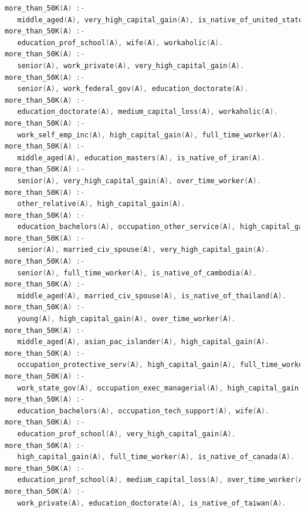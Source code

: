 \documentclass[a4paper]{llncs}
\begin{document}
\begin{lstlisting}[language=c,frame=single,breaklines=true,basicstyle=\footnotesize\ttfamily,caption={Subset of the prolog clauses produced by Aleph},label=ilp_clauses]
more_than_50K(A) :-
   middle_aged(A), very_high_capital_gain(A), is_native_of_united_states(A).
more_than_50K(A) :-
   education_prof_school(A), wife(A), workaholic(A).
more_than_50K(A) :-
   senior(A), work_private(A), very_high_capital_gain(A).
more_than_50K(A) :-
   senior(A), work_federal_gov(A), education_doctorate(A).
more_than_50K(A) :-
   education_doctorate(A), medium_capital_loss(A), workaholic(A).
more_than_50K(A) :-
   work_self_emp_inc(A), high_capital_gain(A), full_time_worker(A).
more_than_50K(A) :-
   middle_aged(A), education_masters(A), is_native_of_iran(A).
more_than_50K(A) :-
   senior(A), very_high_capital_gain(A), over_time_worker(A).
more_than_50K(A) :-
   other_relative(A), high_capital_gain(A).
more_than_50K(A) :-
   education_bachelors(A), occupation_other_service(A), high_capital_gain(A).
more_than_50K(A) :-
   senior(A), married_civ_spouse(A), very_high_capital_gain(A).
more_than_50K(A) :-
   senior(A), full_time_worker(A), is_native_of_cambodia(A).
more_than_50K(A) :-
   middle_aged(A), married_civ_spouse(A), is_native_of_thailand(A).
more_than_50K(A) :-
   young(A), high_capital_gain(A), over_time_worker(A).
more_than_50K(A) :-
   middle_aged(A), asian_pac_islander(A), high_capital_gain(A).
more_than_50K(A) :-
   occupation_protective_serv(A), high_capital_gain(A), full_time_worker(A).
more_than_50K(A) :-
   work_state_gov(A), occupation_exec_managerial(A), high_capital_gain(A).
more_than_50K(A) :-
   education_bachelors(A), occupation_tech_support(A), wife(A).
more_than_50K(A) :-
   education_prof_school(A), very_high_capital_gain(A).
more_than_50K(A) :-
   high_capital_gain(A), full_time_worker(A), is_native_of_canada(A).
more_than_50K(A) :-
   education_prof_school(A), medium_capital_loss(A), over_time_worker(A).
more_than_50K(A) :-
   work_private(A), education_doctorate(A), is_native_of_taiwan(A).
\end{lstlisting}
\end{document}
